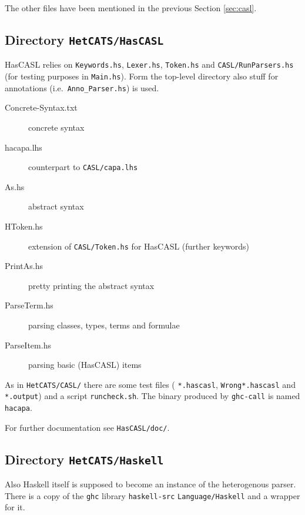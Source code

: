 \documentclass{article}
\begin{document}
The other files have been mentioned in the previous
Section \ref{sec:casl}.

\subsection{Directory \texttt{HetCATS/HasCASL}}

HasCASL relies on \texttt{Keywords.hs}, \texttt{Lexer.hs},
\texttt{Token.hs} and \texttt{CASL/RunParsers.hs} (for testing
purposes in \texttt{Main.hs}). Form the top-level directory also stuff
for annotations (i.e.\ \texttt{Anno\_Parser.hs}) is used.

\begin{description}
\item[Concrete-Syntax.txt] concrete syntax
\item[hacapa.lhs] counterpart to \texttt{CASL/capa.lhs} 
\item[As.hs] abstract syntax
\item[HToken.hs] extension of \texttt{CASL/Token.hs} for HasCASL
  (further keywords)
\item[PrintAs.hs] pretty printing the abstract syntax
\item[ParseTerm.hs] parsing classes, types, terms and formulae
\item[ParseItem.hs] parsing basic (HasCASL) items
\end{description}

As in \texttt{HetCATS/CASL/} there are some test files (
\texttt{*.hascasl}, \texttt{Wrong*.hascasl} and \texttt{*.output}) and a
script \texttt{runcheck.sh}. The binary produced by \texttt{ghc-call}
is named \texttt{hacapa}.

For further documentation see \texttt{HasCASL/doc/}. 

\subsection{Directory \texttt{HetCATS/Haskell}}

Also Haskell itself is supposed to become an instance of the heterogenous
parser. There is a copy of the \texttt{ghc} library \texttt{haskell-src}
\texttt{Language/Haskell} and a wrapper for it.
\end{document}
